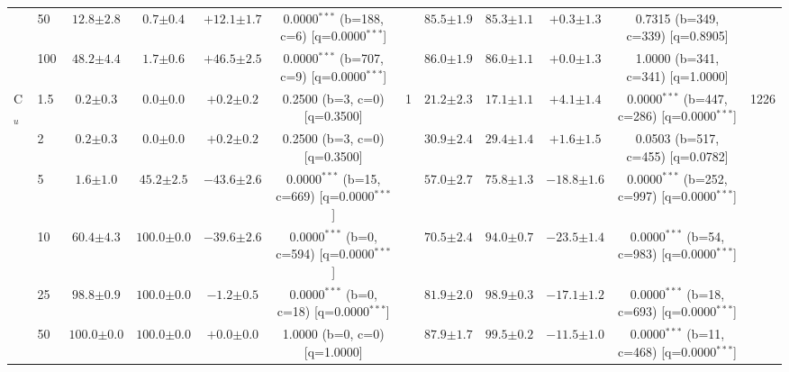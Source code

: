 \begin{table}[h!]
\begin{tabular}{l l | cccc c | cccc c}
 & 50 & $12.8 {\scriptstyle \pm 2.8}$ & $0.7 {\scriptstyle \pm 0.4}$ & $+12.1 {\scriptstyle \pm 1.7}$ & 0.0000$^{***}$ (b=188, c=6) [q=0.0000$^{***}$] &  & $85.5 {\scriptstyle \pm 1.9}$ & $85.3 {\scriptstyle \pm 1.1}$ & $+0.3 {\scriptstyle \pm 1.3}$ & 0.7315 (b=349, c=339) [q=0.8905] &  \\
 & 100 & $48.2 {\scriptstyle \pm 4.4}$ & $1.7 {\scriptstyle \pm 0.6}$ & $+46.5 {\scriptstyle \pm 2.5}$ & 0.0000$^{***}$ (b=707, c=9) [q=0.0000$^{***}$] &  & $86.0 {\scriptstyle \pm 1.9}$ & $86.0 {\scriptstyle \pm 1.1}$ & $+0.0 {\scriptstyle \pm 1.3}$ & 1.0000 (b=341, c=341) [q=1.0000] &  \\
\midrule
C$_u$ & 1.5 & $0.2 {\scriptstyle \pm 0.3}$ & $0.0 {\scriptstyle \pm 0.0}$ & $+0.2 {\scriptstyle \pm 0.2}$ & 0.2500 (b=3, c=0) [q=0.3500] & 1 & $21.2 {\scriptstyle \pm 2.3}$ & $17.1 {\scriptstyle \pm 1.1}$ & $+4.1 {\scriptstyle \pm 1.4}$ & 0.0000$^{***}$ (b=447, c=286) [q=0.0000$^{***}$] & 1226 \\
 & 2 & $0.2 {\scriptstyle \pm 0.3}$ & $0.0 {\scriptstyle \pm 0.0}$ & $+0.2 {\scriptstyle \pm 0.2}$ & 0.2500 (b=3, c=0) [q=0.3500] &  & $30.9 {\scriptstyle \pm 2.4}$ & $29.4 {\scriptstyle \pm 1.4}$ & $+1.6 {\scriptstyle \pm 1.5}$ & 0.0503 (b=517, c=455) [q=0.0782] &  \\
 & 5 & $1.6 {\scriptstyle \pm 1.0}$ & $45.2 {\scriptstyle \pm 2.5}$ & $-43.6 {\scriptstyle \pm 2.6}$ & 0.0000$^{***}$ (b=15, c=669) [q=0.0000$^{***}$] &  & $57.0 {\scriptstyle \pm 2.7}$ & $75.8 {\scriptstyle \pm 1.3}$ & $-18.8 {\scriptstyle \pm 1.6}$ & 0.0000$^{***}$ (b=252, c=997) [q=0.0000$^{***}$] &  \\
 & 10 & $60.4 {\scriptstyle \pm 4.3}$ & $100.0 {\scriptstyle \pm 0.0}$ & $-39.6 {\scriptstyle \pm 2.6}$ & 0.0000$^{***}$ (b=0, c=594) [q=0.0000$^{***}$] &  & $70.5 {\scriptstyle \pm 2.4}$ & $94.0 {\scriptstyle \pm 0.7}$ & $-23.5 {\scriptstyle \pm 1.4}$ & 0.0000$^{***}$ (b=54, c=983) [q=0.0000$^{***}$] &  \\
 & 25 & $98.8 {\scriptstyle \pm 0.9}$ & $100.0 {\scriptstyle \pm 0.0}$ & $-1.2 {\scriptstyle \pm 0.5}$ & 0.0000$^{***}$ (b=0, c=18) [q=0.0000$^{***}$] &  & $81.9 {\scriptstyle \pm 2.0}$ & $98.9 {\scriptstyle \pm 0.3}$ & $-17.1 {\scriptstyle \pm 1.2}$ & 0.0000$^{***}$ (b=18, c=693) [q=0.0000$^{***}$] &  \\
 & 50 & $100.0 {\scriptstyle \pm 0.0}$ & $100.0 {\scriptstyle \pm 0.0}$ & $+0.0 {\scriptstyle \pm 0.0}$ & 1.0000 (b=0, c=0) [q=1.0000] &  & $87.9 {\scriptstyle \pm 1.7}$ & $99.5 {\scriptstyle \pm 0.2}$ & $-11.5 {\scriptstyle \pm 1.0}$ & 0.0000$^{***}$ (b=11, c=468) [q=0.0000$^{***}$] &  \\

\end{tabular}
\end{table}
